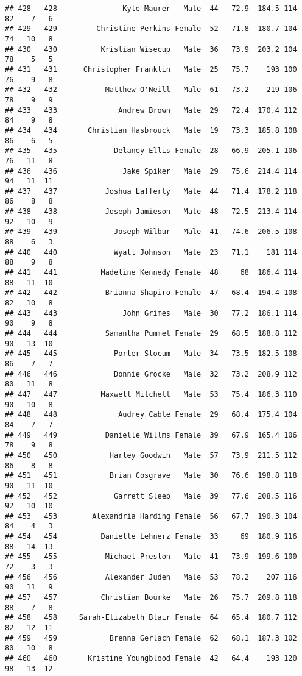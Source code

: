 \documentclass[
]{article}
\begin{document}
\begin{verbatim}
## 428   428               Kyle Maurer   Male  44   72.9  184.5 114  82    7   6
## 429   429         Christine Perkins Female  52   71.8  180.7 104  74   10   8
## 430   430          Kristian Wisecup   Male  36   73.9  203.2 104  78    5   5
## 431   431      Christopher Franklin   Male  25   75.7    193 100  76    9   8
## 432   432           Matthew O'Neill   Male  61   73.2    219 106  78    9   9
## 433   433              Andrew Brown   Male  29   72.4  170.4 112  84    9   8
## 434   434       Christian Hasbrouck   Male  19   73.3  185.8 108  86    6   5
## 435   435             Delaney Ellis Female  28   66.9  205.1 106  76   11   8
## 436   436               Jake Spiker   Male  29   75.6  214.4 114  94   11  11
## 437   437           Joshua Lafferty   Male  44   71.4  178.2 118  86    8   8
## 438   438           Joseph Jamieson   Male  48   72.5  213.4 114  92   10   9
## 439   439             Joseph Wilbur   Male  41   74.6  206.5 108  88    6   3
## 440   440             Wyatt Johnson   Male  23   71.1    181 114  88    9   8
## 441   441          Madeline Kennedy Female  48     68  186.4 114  88   11  10
## 442   442           Brianna Shapiro Female  47   68.4  194.4 108  82   10   8
## 443   443               John Grimes   Male  30   77.2  186.1 114  90    9   8
## 444   444           Samantha Pummel Female  29   68.5  188.8 112  90   13  10
## 445   445             Porter Slocum   Male  34   73.5  182.5 108  86    7   7
## 446   446             Donnie Grocke   Male  32   73.2  208.9 112  80   11   8
## 447   447          Maxwell Mitchell   Male  53   75.4  186.3 110  90   10   8
## 448   448              Audrey Cable Female  29   68.4  175.4 104  84    7   7
## 449   449           Danielle Willms Female  39   67.9  165.4 106  78    9   8
## 450   450            Harley Goodwin   Male  57   73.9  211.5 112  86    8   8
## 451   451            Brian Cosgrave   Male  30   76.6  198.8 118  90   11  10
## 452   452             Garrett Sleep   Male  39   77.6  208.5 116  92   10  10
## 453   453        Alexandria Harding Female  56   67.7  190.3 104  84    4   3
## 454   454          Danielle Lehnerz Female  33     69  180.9 116  88   14  13
## 455   455           Michael Preston   Male  41   73.9  199.6 100  72    3   3
## 456   456           Alexander Juden   Male  53   78.2    207 116  90   11   9
## 457   457          Christian Bourke   Male  26   75.7  209.8 118  88    7   8
## 458   458     Sarah-Elizabeth Blair Female  64   65.4  180.7 112  82   12  11
## 459   459            Brenna Gerlach Female  62   68.1  187.3 102  80   10   8
## 460   460       Kristine Youngblood Female  42   64.4    193 120  98   13  12

\end{verbatim}
\end{document}
